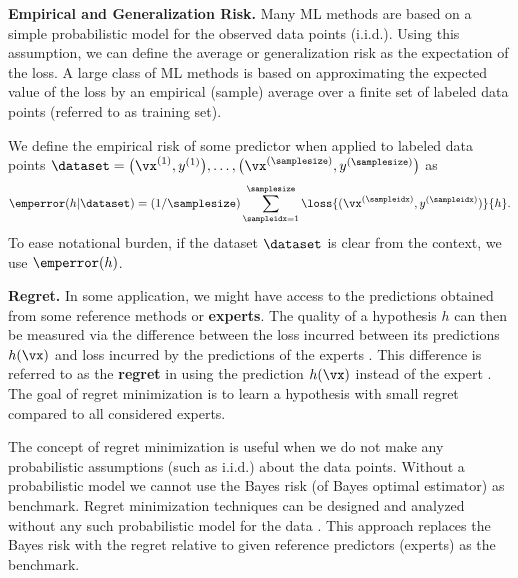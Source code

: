 \documentclass[12pt]{report}
\begin{document}
\begin{center}
\end{center}

{\bf Empirical and Generalization Risk.} 
Many ML methods are based on a simple probabilistic model for the 
observed data points (i.i.d.). Using this assumption, we can define the 
average or generalization risk as the expectation of the loss. A large class 
of ML methods is based on approximating the expected value of the loss 
by an empirical (sample) average over a finite set of labeled data points 
(referred to as training set). 

We define the empirical risk of some predictor when applied to labeled data points $\dataset=\big(\vx^{(1)},y^{(1)}\big),\ldots,\big(\vx^{(\samplesize)},y^{(\samplesize)}\big)$ 
as 
\begin{equation} 
\label{eq_def_emp_error_101}
\emperror(h|\dataset) = (1/\samplesize)\sum_{\sampleidx=1}^{\samplesize} \loss{(\vx^{(\sampleidx)},y^{(\sampleidx)})}{h}.  
\end{equation} 
To ease notational burden, if the dataset $\dataset$ is clear from the context, 
we use $\emperror(h)$. 

{\bf Regret.} In some application, we might have access to the 
predictions obtained from some reference methods or {\bf experts}. 
The quality of a hypothesis $h$ can then be measured via the 
difference between the loss incurred between its predictions 
$h(\vx)$ and loss incurred by the predictions of the experts 
\cite{HazanOCO}. This difference is referred to as the {\bf regret} 
in using the prediction $h(\vx)$ instead of the expert . 
The goal of regret minimization is to learn a hypothesis 
with small regret compared to all considered experts. 

The concept of regret minimization is useful when we do 
not make any probabilistic assumptions (such as i.i.d.) about 
the data points. Without a probabilistic model we cannot use 
the Bayes risk (of Bayes optimal estimator) as benchmark. 
Regret minimization techniques can be designed and analyzed 
without any such probabilistic model for the data \cite{PredictionLearningGames}. 
This approach replaces the Bayes risk with the regret relative to 
given reference predictors (experts) as the benchmark. 
\end{document}
